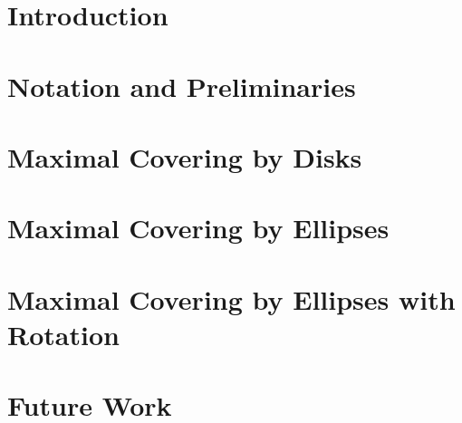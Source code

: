 \documentclass[mestrado]{packages/icmc}
\begin{document}
\textual

\chapter{Introduction}
\label{chapter:introduction}


\chapter{Notation and Preliminaries}
\label{chapter:definitions}


\chapter{Maximal Covering by Disks}
\label{chapter:pmclp}


\chapter{Maximal Covering by Ellipses}
\label{chapter:ellipses}


\chapter{Maximal Covering by Ellipses with Rotation}
\label{chapter:ellipses_n}


\chapter{Future Work}
\label{chapter:future_work}


%

%

%
\end{document}

